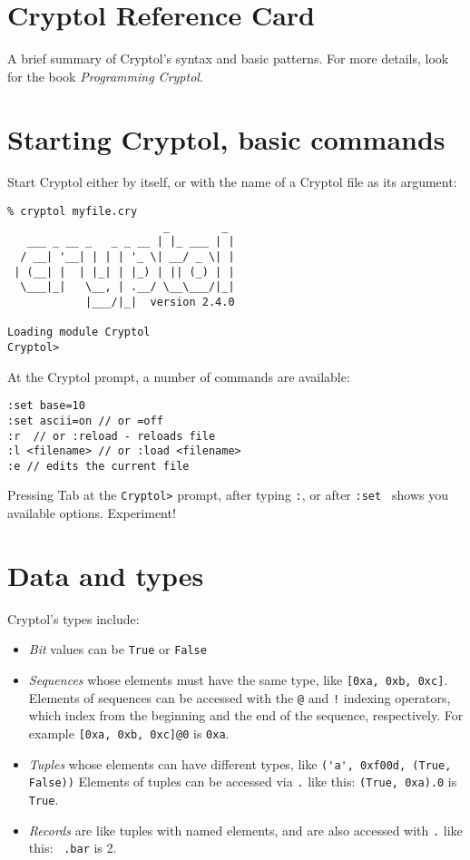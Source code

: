 \documentclass[9pt,letter]{article}
\begin{document}
\section{Cryptol Reference Card} 
A brief summary of Cryptol's syntax and basic patterns. For more details, look for the book {\it Programming Cryptol}.
\section{Starting Cryptol, basic commands}
Start Cryptol either by itself, or with the name of a Cryptol file as its argument:
\begin{verbatim}
% cryptol myfile.cry
                        _        _
   ___ _ __ _   _ _ __ | |_ ___ | |
  / __| '__| | | | '_ \| __/ _ \| |
 | (__| |  | |_| | |_) | || (_) | |
  \___|_|   \__, | .__/ \__\___/|_|
            |___/|_|  version 2.4.0

Loading module Cryptol
Cryptol> 
\end{verbatim}

At the Cryptol prompt, a number of commands are available:
\begin{verbatim}
:set base=10   
:set ascii=on // or =off
:r  // or :reload - reloads file
:l <filename> // or :load <filename>
:e // edits the current file
\end{verbatim}
Pressing Tab at the \verb|Cryptol>| prompt, after typing \verb|:|, or after \verb|:set | shows you available options. Experiment!

\section{Data and types}
Cryptol's types include:
\begin{itemize}
\item{\it Bit} values can be \verb|True| or \verb|False|
\item{\it Sequences} whose elements must have the same type, like \verb+[0xa, 0xb, 0xc]+. Elements of sequences can be accessed with the \verb|@| and \verb|!| indexing operators, which index from the beginning and the end of the sequence, respectively. For example \verb+[0xa, 0xb, 0xc]@0+ is \verb+0xa+.
\item{\it Tuples} whose elements can have different types, like \verb+('a', 0xf00d, (True, False))+ Elements of tuples can be accessed via \verb+.+ like this: \texttt{(True, 0xa).0} is \verb+True+.
\item{\it Records} are like tuples with named elements, and are also accessed with \verb+.+ like this:  \texttt{ .bar} is 2.
\end{itemize}
\end{document}
